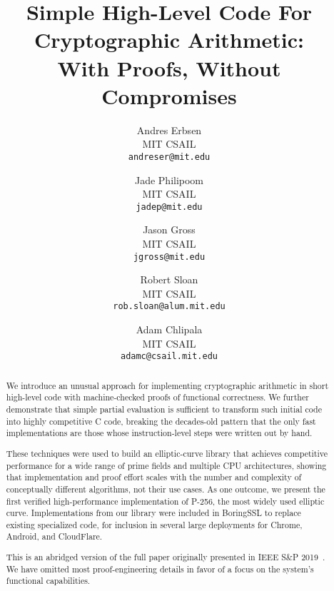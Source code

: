 \documentclass[letterpaper,twocolumn,10pt]{article}
\begin{document}

\date{}

\title{\Large \bf Simple High-Level Code For Cryptographic Arithmetic: \\ With Proofs, Without Compromises}

\author{
{\rm Andres Erbsen} \\
MIT CSAIL \\
{\rm \texttt{andreser@mit.edu}}
\and
{\rm Jade Philipoom} \\
MIT CSAIL \\
{\rm \texttt{jadep@mit.edu}}
\and
{\rm Jason Gross} \\
MIT CSAIL \\
{\rm \texttt{jgross@mit.edu}}
\and
{\rm Robert Sloan} \\
MIT CSAIL \\
{\rm \texttt{rob.sloan@alum.mit.edu}}
\and
{\rm Adam Chlipala} \\
MIT CSAIL \\
{\rm \texttt{adamc@csail.mit.edu}}
} %

\maketitle

\begin{abstract}
  We introduce an unusual approach for implementing cryptographic arithmetic in short high-level code with machine-checked proofs of functional correctness.
  We further demonstrate that simple partial evaluation is sufficient to transform such initial code into highly competitive C code, breaking the decades-old pattern that the only fast implementations are those whose instruction-level steps were written out by hand.

These techniques were used to build an elliptic-curve library that achieves competitive performance for a wide range of prime fields and multiple CPU architectures, showing that implementation and proof effort scales with the number and complexity of conceptually different algorithms, not their use cases.
As one outcome, we present the first verified high-performance implementation of P-256, the most widely used elliptic curve.
Implementations from our library were included in BoringSSL to replace existing specialized code, for inclusion in several large deployments for Chrome, Android, and CloudFlare.

This is an abridged version of the full paper originally presented in IEEE S\&P 2019~\cite{FiatCryptoSP19}.
We have omitted most proof-engineering details in favor of a focus on the system's functional capabilities.
\end{abstract}
\end{document}
